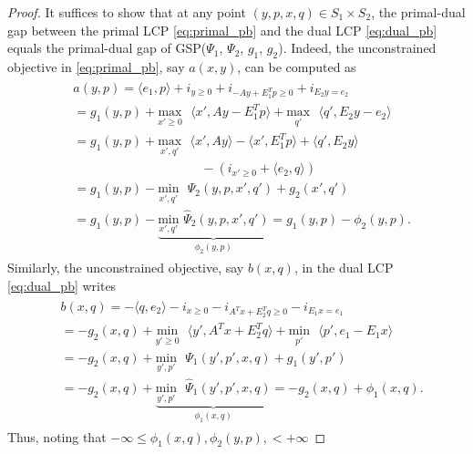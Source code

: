 \documentclass[a4paper,9pt]{extarticle}
\begin{document}
\begin{proof}
It suffices to show that at any point $(y, p, x,
q) \in S_1 \times S_2$, the primal-dual gap between the primal
LCP \eqref{eq:primal_pb} and the dual LCP \eqref{eq:dual_pb} equals
the primal-dual gap of GSP($\Psi_1$, $\Psi_2$, $g_1$, $g_2$).
Indeed, the unconstrained objective in \eqref{eq:primal_pb}, say
$a(x,y)$, can be computed as
\begin{eqnarray*}
  \begin{aligned}
    &a(y,p) = \langle e_1,p\rangle + i_{y\ge 0} + i_{-Ay + E_1^Tp \ge 0} +
    i_{E_2y = e_2}\\
    &= g_1(y,p) + \underset{x' \geq
      0}{\text{max}}\text{ }\langle x',Ay - E_1^Tp\rangle +
    \underset{q'}{\text{max}}\text{ }\langle q',E_2y - e_2\rangle\\
    &= g_1(y,p) + \underset{x',
      q'}{\text{max}}\text{ }\langle x',Ay\rangle - \langle x',
    E_1^Tp\rangle + \langle q',E_2y\rangle\\
    &\hspace{10em}-
    (i_{x' \ge 0} + \langle e_2,q\rangle)\\
    &= g_1(y,p)
      - \underset{x',q'}{\text{min}}\text{ }\Psi_2(y, p, x', q') + g_2(x',
      q')\\
      &= g_1(y,p)
      - \underbrace{\underset{x',q'}{\text{min}}\text{
        }\hat{\Psi}_2(y, p, x', q')}_{\phi_2(y,p)}
      = g_1(y, p) - \phi_2(y, p).
  \end{aligned}
  \label{eq:a}
\end{eqnarray*}
Similarly, the unconstrained objective, say
$b(x, q)$, in the dual LCP \eqref{eq:dual_pb} writes
\begin{eqnarray*}
  \begin{aligned}
&b(x, q) = 
-\langle q, e_2\rangle -i_{x \ge 0} - i_{A^Tx+E_2^Tq \ge 0} -
 i_{E_1x = e_1}\\
 &= -g_2(x, q) + \underset{y' \geq
   0}{\text{min}}\text{ }\langle y', A^Tx + E_2^Tq\rangle +
 \underset{p'}{\text{min}}\text{ }\langle p', e_1-E_1x\rangle\\
    &= -g_2(x, q)
 +\underset{y',p'}{\text{min}}\text{ }\Psi_1(y', p', x, q) +
 g_1(y', p')\\
& = -g_2(x, q) +
 \underbrace{\underset{y',p'}{\text{min}}\text{ }\hat{\Psi}_1(y', p',
   x, q)}_{\phi_1(x, q)} = -g_2(x, q) + \phi_1(x, q). 
   \end{aligned}
\end{eqnarray*}
Thus, noting that $-\infty \le \phi_1(x, q), \phi_2(y, p), < +\infty$

\end{proof}
\end{document}
